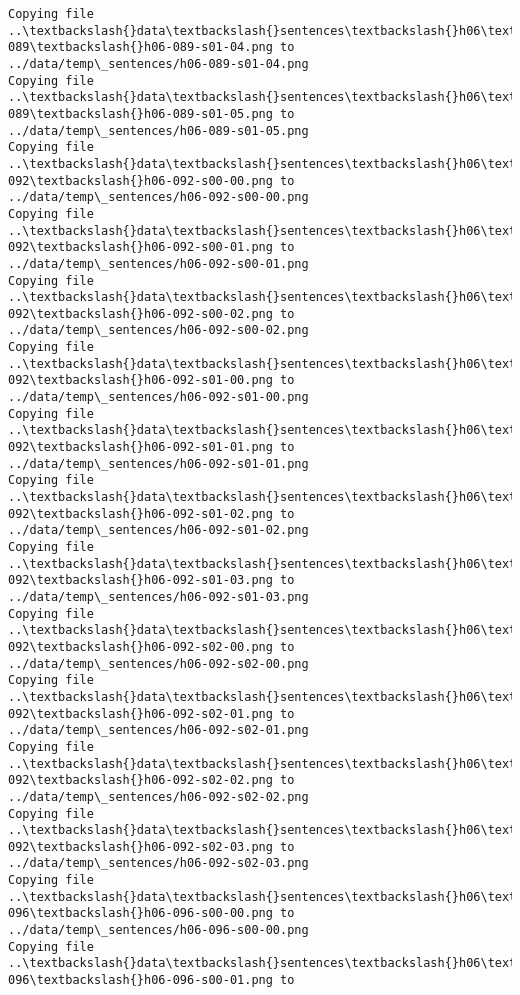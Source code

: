 \documentclass[11pt]{article}
\begin{document}
\begin{Verbatim}[commandchars=\\\{\}]
Copying file ..\textbackslash{}data\textbackslash{}sentences\textbackslash{}h06\textbackslash{}h06-089\textbackslash{}h06-089-s01-04.png to
../data/temp\_sentences/h06-089-s01-04.png
Copying file ..\textbackslash{}data\textbackslash{}sentences\textbackslash{}h06\textbackslash{}h06-089\textbackslash{}h06-089-s01-05.png to
../data/temp\_sentences/h06-089-s01-05.png
Copying file ..\textbackslash{}data\textbackslash{}sentences\textbackslash{}h06\textbackslash{}h06-092\textbackslash{}h06-092-s00-00.png to
../data/temp\_sentences/h06-092-s00-00.png
Copying file ..\textbackslash{}data\textbackslash{}sentences\textbackslash{}h06\textbackslash{}h06-092\textbackslash{}h06-092-s00-01.png to
../data/temp\_sentences/h06-092-s00-01.png
Copying file ..\textbackslash{}data\textbackslash{}sentences\textbackslash{}h06\textbackslash{}h06-092\textbackslash{}h06-092-s00-02.png to
../data/temp\_sentences/h06-092-s00-02.png
Copying file ..\textbackslash{}data\textbackslash{}sentences\textbackslash{}h06\textbackslash{}h06-092\textbackslash{}h06-092-s01-00.png to
../data/temp\_sentences/h06-092-s01-00.png
Copying file ..\textbackslash{}data\textbackslash{}sentences\textbackslash{}h06\textbackslash{}h06-092\textbackslash{}h06-092-s01-01.png to
../data/temp\_sentences/h06-092-s01-01.png
Copying file ..\textbackslash{}data\textbackslash{}sentences\textbackslash{}h06\textbackslash{}h06-092\textbackslash{}h06-092-s01-02.png to
../data/temp\_sentences/h06-092-s01-02.png
Copying file ..\textbackslash{}data\textbackslash{}sentences\textbackslash{}h06\textbackslash{}h06-092\textbackslash{}h06-092-s01-03.png to
../data/temp\_sentences/h06-092-s01-03.png
Copying file ..\textbackslash{}data\textbackslash{}sentences\textbackslash{}h06\textbackslash{}h06-092\textbackslash{}h06-092-s02-00.png to
../data/temp\_sentences/h06-092-s02-00.png
Copying file ..\textbackslash{}data\textbackslash{}sentences\textbackslash{}h06\textbackslash{}h06-092\textbackslash{}h06-092-s02-01.png to
../data/temp\_sentences/h06-092-s02-01.png
Copying file ..\textbackslash{}data\textbackslash{}sentences\textbackslash{}h06\textbackslash{}h06-092\textbackslash{}h06-092-s02-02.png to
../data/temp\_sentences/h06-092-s02-02.png
Copying file ..\textbackslash{}data\textbackslash{}sentences\textbackslash{}h06\textbackslash{}h06-092\textbackslash{}h06-092-s02-03.png to
../data/temp\_sentences/h06-092-s02-03.png
Copying file ..\textbackslash{}data\textbackslash{}sentences\textbackslash{}h06\textbackslash{}h06-096\textbackslash{}h06-096-s00-00.png to
../data/temp\_sentences/h06-096-s00-00.png
Copying file ..\textbackslash{}data\textbackslash{}sentences\textbackslash{}h06\textbackslash{}h06-096\textbackslash{}h06-096-s00-01.png to

\end{Verbatim}
\end{document}
